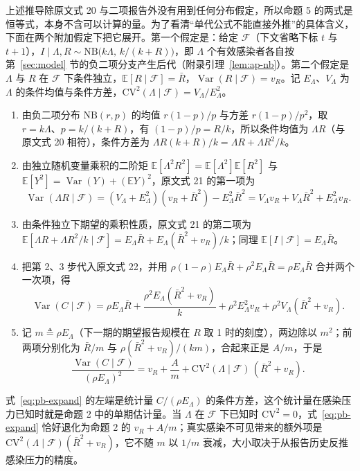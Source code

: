 上述推导除原文式 20 与二项报告外没有用到任何分布假定，所以命题 5 的两式是恒等式，本身不含可以计算的量。为了看清“单代公式不能直接外推”的具体含义，下面在两个附加假定下把它展开。第一个假定是：给定 $\mathcal F$（下文省略下标 $t$ 与 $t+1$），$I\mid\Lambda,R\sim\mathrm{NB}\big(k\Lambda,\,k/(k+R)\big)$，即 $\Lambda$ 个有效感染者各自按第~\ref{sec:model} 节的负二项分支产生后代（附录引理~\ref{lem:ap-nb}）。第二个假定是 $\Lambda$ 与 $R$ 在 $\mathcal F$ 下条件独立，$\mathbb E[R\mid\mathcal F]=\bar R$，$\operatorname{Var}(R\mid\mathcal F)=v_R$。记 $E_\Lambda$、$V_\Lambda$ 为 $\Lambda$ 的条件均值与条件方差，$\mathrm{CV}^2(\Lambda\mid\mathcal F)=V_\Lambda/E_\Lambda^2$。
\begin{enumerate}
\item 由负二项分布 $\mathrm{NB}(r,p)$ 的均值 $r(1-p)/p$ 与方差 $r(1-p)/p^2$，取 $r=k\Lambda$、$p=k/(k+R)$，有 $(1-p)/p=R/k$，所以条件均值为 $\Lambda R$（与原文式 20 相符），条件方差为 $\Lambda R(k+R)/k=\Lambda R+\Lambda R^2/k$。
\item 由独立随机变量乘积的二阶矩 $\mathbb E[\Lambda^2R^2]=\mathbb E[\Lambda^2]\mathbb E[R^2]$ 与 $\mathbb E[Y^2]=\operatorname{Var}(Y)+(\mathbb EY)^2$，原文式 21 的第一项为
\begin{equation*}
\operatorname{Var}(\Lambda R\mid\mathcal F)=(V_\Lambda+E_\Lambda^2)(v_R+\bar R^2)-E_\Lambda^2\bar R^2=V_\Lambda v_R+V_\Lambda\bar R^2+E_\Lambda^2v_R .
\end{equation*}
\item 由条件独立下期望的乘积性质，原文式 21 的第二项为 $\mathbb E[\Lambda R+\Lambda R^2/k\mid\mathcal F]=E_\Lambda\bar R+E_\Lambda(\bar R^2+v_R)/k$；同理 $\mathbb E[I\mid\mathcal F]=E_\Lambda\bar R$。
\item 把第 2、3 步代入原文式 22，并用 $\rho(1-\rho)E_\Lambda\bar R+\rho^2E_\Lambda\bar R=\rho E_\Lambda\bar R$ 合并两个一次项，得
\begin{equation*}
\operatorname{Var}(C\mid\mathcal F)=\rho E_\Lambda\bar R+\frac{\rho^2E_\Lambda(\bar R^2+v_R)}{k}+\rho^2E_\Lambda^2v_R+\rho^2V_\Lambda(\bar R^2+v_R).
\end{equation*}
\item 记 $m\triangleq\rho E_\Lambda$（下一期的期望报告规模在 $R$ 取 1 时的刻度），两边除以 $m^2$；前两项分别化为 $\bar R/m$ 与 $\rho(\bar R^2+v_R)/(km)$，合起来正是 $A/m$，于是
\begin{equation}
\frac{\operatorname{Var}(C\mid\mathcal F)}{(\rho E_\Lambda)^2}=v_R+\frac{A}{m}+\mathrm{CV}^2(\Lambda\mid\mathcal F)\,(\bar R^2+v_R).\label{eq:pb-expand}
\end{equation}
\end{enumerate}
式~\eqref{eq:pb-expand} 的左端是统计量 $C/(\rho E_\Lambda)$ 的条件方差，这个统计量在感染压力已知时就是命题 2 中的单期估计量。当 $\Lambda$ 在 $\mathcal F$ 下已知时 $\mathrm{CV}^2=0$，式~\eqref{eq:pb-expand} 恰好退化为命题 2 的 $v_R+A/m$；真实感染不可见带来的额外项是 $\mathrm{CV}^2(\Lambda\mid\mathcal F)(\bar R^2+v_R)$，它不随 $m$ 以 $1/m$ 衰减，大小取决于从报告历史反推感染压力的精度。

